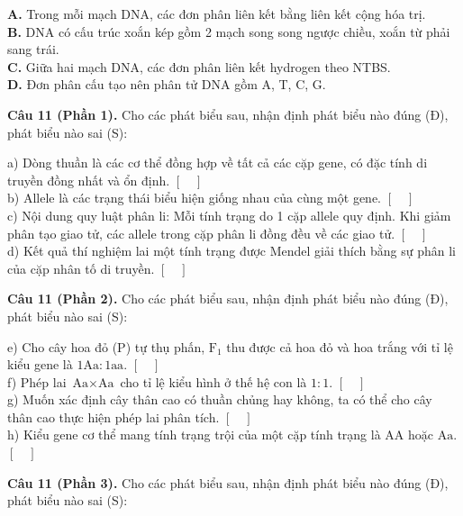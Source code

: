 \documentclass{article}
\begin{document}
\textbf{A.} Trong mỗi mạch DNA, các đơn phân liên kết bằng liên kết cộng hóa trị.\\
\textbf{B.} DNA có cấu trúc xoắn kép gồm 2 mạch song song ngược chiều, xoắn từ phải sang trái.\\
\textbf{C.} Giữa hai mạch DNA, các đơn phân liên kết hydrogen theo NTBS.\\
\textbf{D.} Đơn phân cấu tạo nên phân tử DNA gồm A, T, C, G.
\vspace*{\fill}
\newpage

\fontsize{24}{32}\selectfont
\textbf{Câu 11 (Phần 1).} Cho các phát biểu sau, nhận định phát biểu nào đúng (Đ), phát biểu nào sai (S):
\vspace{12pt}

a) Dòng thuần là các cơ thể đồng hợp về tất cả các cặp gene, có đặc tính di truyền đồng nhất và ổn định. \hfill $[\quad]$\\[10pt]
b) Allele là các trạng thái biểu hiện giống nhau của cùng một gene. \hfill $[\quad]$\\[10pt]
c) Nội dung quy luật phân li: Mỗi tính trạng do 1 cặp allele quy định. Khi giảm phân tạo giao tử, các allele trong cặp phân li đồng đều về các giao tử. \hfill $[\quad]$\\[10pt]
d) Kết quả thí nghiệm lai một tính trạng được Mendel giải thích bằng sự phân li của cặp nhân tố di truyền. \hfill $[\quad]$
\vspace*{\fill}
\newpage

\fontsize{24}{32}\selectfont
\textbf{Câu 11 (Phần 2).} Cho các phát biểu sau, nhận định phát biểu nào đúng (Đ), phát biểu nào sai (S):
\vspace{12pt}

e) Cho cây hoa đỏ (P) tự thụ phấn, $\text{F}_1$ thu được cả hoa đỏ và hoa trắng với tỉ lệ kiểu gene là $1\text{Aa} : 1\text{aa}$. \hfill $[\quad]$\\[10pt]
f) Phép lai $\text{Aa} \times \text{Aa}$ cho tỉ lệ kiểu hình ở thế hệ con là $1 : 1$. \hfill $[\quad]$\\[10pt]
g) Muốn xác định cây thân cao có thuần chủng hay không, ta có thể cho cây thân cao thực hiện phép lai phân tích. \hfill $[\quad]$\\[10pt]
h) Kiểu gene cơ thể mang tính trạng trội của một cặp tính trạng là $\text{AA}$ hoặc $\text{Aa}$. \hfill $[\quad]$
\vspace*{\fill}
\newpage

\fontsize{24}{32}\selectfont
\textbf{Câu 11 (Phần 3).} Cho các phát biểu sau, nhận định phát biểu nào đúng (Đ), phát biểu nào sai (S):
\vspace{10pt}
\end{document}
